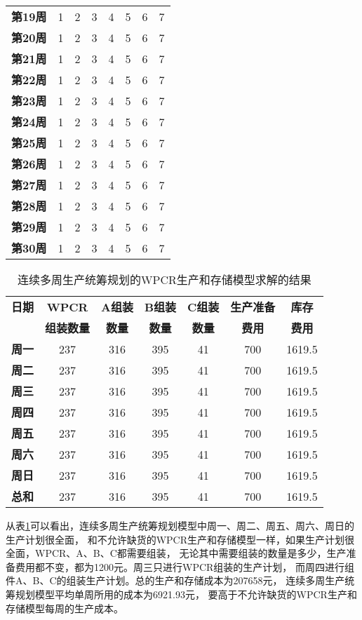 \begin{longtable}[c]{c*{7}{r}}
    \textbf{第19周}  & 1 & 2 & 3 & 4 & 5 & 6 & 7 \\
    \textbf{第20周}  & 1 & 2 & 3 & 4 & 5 & 6 & 7 \\
    \textbf{第21周}  & 1 & 2 & 3 & 4 & 5 & 6 & 7 \\
    \textbf{第22周}  & 1 & 2 & 3 & 4 & 5 & 6 & 7 \\
    \textbf{第23周}  & 1 & 2 & 3 & 4 & 5 & 6 & 7 \\
    \textbf{第24周}  & 1 & 2 & 3 & 4 & 5 & 6 & 7 \\
    \textbf{第25周}  & 1 & 2 & 3 & 4 & 5 & 6 & 7 \\
    \textbf{第26周}  & 1 & 2 & 3 & 4 & 5 & 6 & 7 \\
    \textbf{第27周}  & 1 & 2 & 3 & 4 & 5 & 6 & 7 \\
    \textbf{第28周}  & 1 & 2 & 3 & 4 & 5 & 6 & 7 \\
    \textbf{第29周}  & 1 & 2 & 3 & 4 & 5 & 6 & 7 \\ 
    \textbf{第30周}  & 1 & 2 & 3 & 4 & 5 & 6 & 7 \\ 
    \bottomrule
\end{longtable}

\begin{table}[!hpt]
    \caption{连续多周生产统筹规划的WPCR生产和存储模型求解的结果}
    \label{T.ch3-2}
    \centering
    \renewcommand\arraystretch{1.5} 
    \begin{tabular}{@{}ccccccc@{}} 
    \toprule
    \textbf{日期} & \multicolumn{1}{c}{\textbf{WPCR}} & \multicolumn{1}{c}{\textbf{A组装}} 
    & \multicolumn{1}{c}{\textbf{B组装}} & \multicolumn{1}{c}{\textbf{C组装}}
    & \multicolumn{1}{c}{\textbf{生产准备}} & \multicolumn{1}{c}{\textbf{库存}} \\
                & \multicolumn{1}{c}{\textbf{组装数量}} & \multicolumn{1}{c}{\textbf{数量}} 
    & \multicolumn{1}{c}{\textbf{数量}} & \multicolumn{1}{c}{\textbf{数量}}
    & \multicolumn{1}{c}{\textbf{费用}} & \multicolumn{1}{c}{\textbf{费用}} \\
    \midrule
    \textbf{周一} & 237 & 316 & 395 & 41 & 700 & 1619.5 \\
    \textbf{周二} & 237 & 316 & 395 & 41 & 700 & 1619.5 \\
    \textbf{周三} & 237 & 316 & 395 & 41 & 700 & 1619.5 \\
    \textbf{周四} & 237 & 316 & 395 & 41 & 700 & 1619.5 \\
    \textbf{周五} & 237 & 316 & 395 & 41 & 700 & 1619.5 \\
    \textbf{周六} & 237 & 316 & 395 & 41 & 700 & 1619.5 \\
    \textbf{周日} & 237 & 316 & 395 & 41 & 700 & 1619.5 \\
    \textbf{总和} & 237 & 316 & 395 & 41 & 700 & 1619.5 \\ 
    \bottomrule
    \end{tabular}
\end{table}



从表\ref{T.ch3-2}可以看出，连续多周生产统筹规划模型中周一、周二、周五、周六、周日的生产计划很全面，
和不允许缺货的WPCR生产和存储模型一样，如果生产计划很全面，WPCR、A、B、C都需要组装，
无论其中需要组装的数量是多少，生产准备费用都不变，都为1200元。周三只进行WPCR组装的生产计划，
而周四进行组件A、B、C的组装生产计划。总的生产和存储成本为207658元，
连续多周生产统筹规划模型平均单周所用的成本为6921.93元，
要高于不允许缺货的WPCR生产和存储模型每周的生产成本。